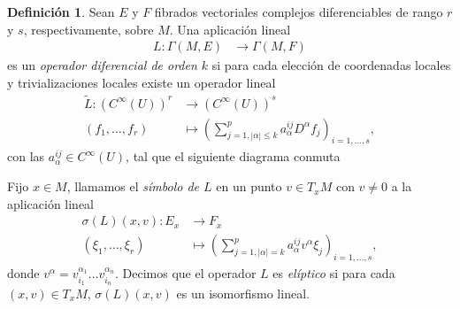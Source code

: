 \documentclass[12pt,a4paper]{article}
\theoremstyle{definition} \newtheorem{defn}[thm]{Definición}
\theoremstyle{definition} \newtheorem{ejemplo}[thm]{Ejemplo}
\theoremstyle{definition} \newtheorem{ejercicio}[thm]{Ejercicio}
\theoremstyle{remark} \newtheorem*{obs}{Observación}
\newcommand{\CC}{\mathbb{C}}
\begin{document}
   \begin{defn}
     Sean $E$ y $F$ fibrados vectoriales complejos diferenciables de rango $r$ y $s$, respectivamente, sobre $M$. Una aplicación lineal
     \begin{align*}
       L :\Gamma(M,E)&\longrightarrow \Gamma(M,F)
       \end{align*}
       es un \emph{operador diferencial de orden $k$} si para cada elección de coordenadas locales y trivializaciones locales existe un operador lineal 
	 \begin{align*}
	 \tilde{L} :(C^\infty(U))^r&\longrightarrow (C^\infty(U))^s\\
	 (f_1,\dots,f_r) &\longmapsto \left(\sum_{j=1, |\alpha|\leq k}^p a^{ij}_\alpha D^\alpha f_j\right)_{i=1,\dots,s},
	   \end{align*}
	   con las $a_{\alpha}^{ij} \in C^\infty(U)$,
	 tal que el siguiente diagrama conmuta
	 \begin{center}
	 \end{center}	
	 Fijo $x\in M$, llamamos el \emph{símbolo de $L$} en un punto $v\in T_xM$ con $v\neq0$ a la aplicación lineal
	 \begin{align*}
	   \sigma(L)(x,v) :E_x&\longrightarrow F_x\\ 
	   (\xi_1,\dots,\xi_r) &\longmapsto \left( \sum_{j=1,|\alpha|=k}^p a_{\alpha}^{ij}v^\alpha\xi_j\right)_{i=1,\dots,s},
	   \end{align*}
	   donde $v^\alpha=v_{i_1}^{\alpha_1}\dots v_{i_n}^{\alpha_n}$.
	   Decimos que el operador $L$ es \emph{elíptico} si para cada $(x,v)\in T_xM$, $\sigma(L)(x,v)$ es un isomorfismo lineal. 
   \end{defn}
\end{document}

